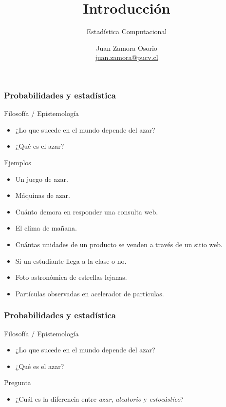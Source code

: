 \documentclass[table]{beamer}
\title{Introducción}
\subtitle{Estadística Computacional}
\author[J.Z.O-2023]{Juan Zamora Osorio\\\url{juan.zamora@pucv.cl}}
\institute[PUCV]{Instituto de Estadística\\Pontificia Universidad Cat\'olica de Valpara\'iso}
\date{}
\begin{document}
\frame{\titlepage}




\begin{frame}
    \frametitle{Probabilidades y estadística}
    \begin{block}{Filosofía / Epistemología}
        \begin{itemize}
            \item ¿Lo que sucede en el mundo depende del azar?
            \item ¿Qué es el azar?
        \end{itemize}
    \end{block}
    \begin{exampleblock}{Ejemplos}
        \begin{itemize}
            \item Un juego de azar.
            \item Máquinas de azar.
            \item Cuánto demora en responder una consulta web.
            \item El clima de mañana.
            \item Cuántas unidades de un producto se venden a través de un sitio web.
            \item Si un estudiante llega a la clase o no.
            \item Foto astronómica de estrellas lejanas.
            \item Partículas observadas en acelerador de partículas.
        \end{itemize}
    \end{exampleblock}
\end{frame}

\begin{frame}
    \frametitle{Probabilidades y estadística}
    \begin{block}{Filosofía / Epistemología}
        \begin{itemize}
            \item ¿Lo que sucede en el mundo depende del azar?
            \item ¿Qué es el azar?
        \end{itemize}
    \end{block}
    \begin{alertblock}{Pregunta}
        \begin{itemize}
            \item ¿Cuál es la diferencia entre \emph{azar}, \emph{aleatorio} y \emph{estocástico}?
        \end{itemize}
    \end{alertblock}
\end{frame}
\end{document}

